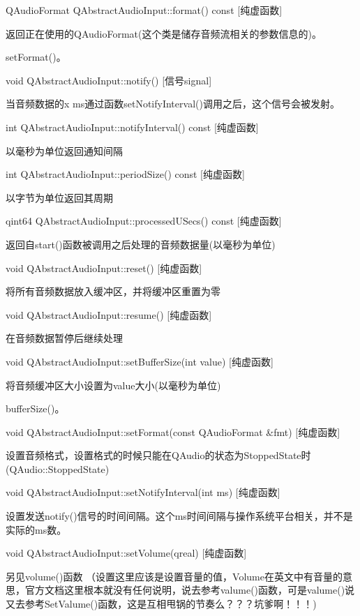 QAudioFormat QAbstractAudioInput::format() const [纯虚函数]

返回正在使用的QAudioFormat(这个类是储存音频流相关的参数信息的)。

\begin{notice}[另请参阅]
setFormat()。
\end{notice}

void QAbstractAudioInput::notify() [信号signal]

当音频数据的x ms通过函数setNotifyInterval()调用之后，这个信号会被发射。

int QAbstractAudioInput::notifyInterval() const [纯虚函数]

以毫秒为单位返回通知间隔

int QAbstractAudioInput::periodSize() const [纯虚函数]

以字节为单位返回其周期

qint64 QAbstractAudioInput::processedUSecs() const [纯虚函数]

返回自start()函数被调用之后处理的音频数据量(以毫秒为单位)

void QAbstractAudioInput::reset() [纯虚函数]

将所有音频数据放入缓冲区，并将缓冲区重置为零

void QAbstractAudioInput::resume() [纯虚函数]

在音频数据暂停后继续处理

void QAbstractAudioInput::setBufferSize(int value) [纯虚函数]

将音频缓冲区大小设置为value大小(以毫秒为单位) 

\begin{notice}[另请参阅]
bufferSize()。
\end{notice}

void QAbstractAudioInput::setFormat(const QAudioFormat \&fmt) [纯虚函数]

设置音频格式，设置格式的时候只能在QAudio的状态为StoppedState时(QAudio::StoppedState)

void QAbstractAudioInput::setNotifyInterval(int ms) [纯虚函数]

设置发送notify()信号的时间间隔。这个ms时间间隔与操作系统平台相关，并不是实际的ms数。

void QAbstractAudioInput::setVolume(qreal) [纯虚函数]

另见volume()函数 （设置这里应该是设置音量的值，Volume在英文中有音量的意思，官方文档这里根本就没有任何说明，说去参考valume()函数，可是valume()说又去参考SetValume()函数，这是互相甩锅的节奏么？？？坑爹啊！！！)

